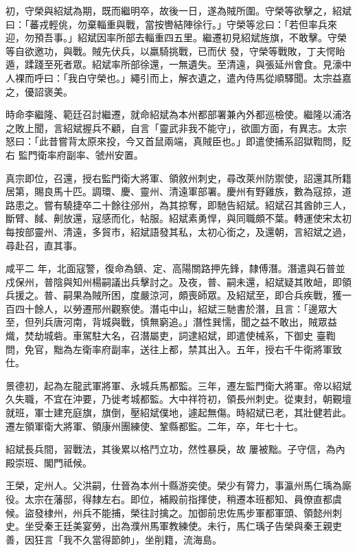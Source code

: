 \begin{pinyinscope}
 初，守榮與紹斌為期，既而繼明卒，故後一日，遂為賊所圍。守榮等欲擊之，紹斌曰：「蕃戎輕佻，勿棄輜重與戰，當按轡結陣徐行。」守榮等忿曰：「若但率兵來迎，勿預吾事。」紹斌因率所部去輜重四五里。繼遷初見紹斌旌旗，不敢擊。守榮等自欲邀功，與戰。賊先伏兵，以羸騎挑戰，已而伏
 發，守榮等戰敗，丁夫愕眙遁，蹂踐至死者眾。紹斌率所部徐還，一無遺失。至清遠，與張延州會食。見濠中人裸而呼曰：「我白守榮也。」繩引而上，解衣遺之，遣內侍馬從順驛聞。太宗益嘉之，優詔褒美。



 時命李繼隆、範廷召討繼遷，就命紹斌為本州都部署兼內外都巡檢使。繼隆以浦洛之敗上聞，言紹斌握兵不顧，自言「靈武非我不能守」，欲圖方面，有異志。太宗怒曰：「此昔嘗背太原來投，今又首鼠兩端，真賊臣也。」即遣使捕系詔獄鞫問，貶右
 監門衛率府副率、虢州安置。



 真宗即位，召還，授右監門衛大將軍、領敘州刺史，尋改萊州防禦使，詔還其所籍居第，賜良馬十匹。調環、慶、靈州、清遠軍部署。慶州有野雞族，數為寇掠，道路患之。嘗有驍捷卒二十餘往邠州，為其掠奪，即馳告紹斌。紹斌召其酋帥三人，斷臂、馘、劓放還，寇感而化，帖服。紹斌素勇悍，與同職頗不葉。轉運使宋太初每按部靈州、清遠，多貿市，紹斌語發其私，太初心銜之，及還朝，言紹斌之過，尋赴召，直其事。



 咸平二
 年，北面寇警，復命為鎮、定、高陽關路押先鋒，隸傅潛。潛遣與石普並戍保州，普陰與知州楊嗣議出兵擊討之。及夜，普、嗣未還，紹斌疑其敗衄，即領兵援之。普、嗣果為賊所困，度嚴涼河，頗喪師眾。及紹斌至，即合兵疾戰，獲一百四十餘人，以勞遷邢州觀察使。潛屯中山，紹斌三馳書於潛，且言：「邊眾大至，但列兵唐河南，背城與戰，慎無窮追。」潛性巽懦，聞之益不敢出，賊眾益熾，焚劫城砦。車駕駐大名，召潛屬吏，詞逮紹斌，即遣使械系，下御史
 臺鞫問，免官，黜為左衛率府副率，送往上都，禁其出入。五年，授右千牛衛將軍致仕。



 景德初，起為左龍武軍將軍、永城兵馬都監。三年，遷左監門衛大將軍。帝以紹斌久失職，不宜在沖要，乃徙考城都監。大中祥符初，領長州刺史。從東封，朝覲壇就班，軍士建充庭旗，旗倒，壓紹斌僕地，遽起無傷。時紹斌已老，其壯健若此。遷左領軍衛大將軍、領康州團練使、鞏縣都監。二年，卒，年七十七。



 紹斌長兵間，習戰法，其後累以格鬥立功，然性暴戾，故
 屢被黜。子守信，為內殿崇班、閣門祗候。



 王榮，定州人。父洪嗣，仕晉為本州十縣游奕使。榮少有膂力，事瀛州馬仁瑀為廝役。太宗在藩邸，得隸左右。即位，補殿前指揮使，稍遷本班都知、員僚直都虞候。盜發棣州，州兵不能捕，榮往討擒之。加御前忠佐馬步軍都軍頭、領懿州刺史。坐受秦王廷美宴勞，出為濮州馬軍教練使。未行，馬仁瑀子告榮與秦王親吏善，因狂言「我不久當得節帥」，坐削籍，流海島。




\end{pinyinscope}
